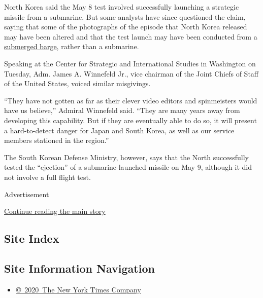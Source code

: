 North Korea said the May 8 test involved successfully launching a
strategic missile from a submarine. But some analysts have since
questioned the claim, saying that some of the photographs of the episode
that North Korea released may have been altered and that the test launch
may have been conducted from a
\href{http://38north.org/2015/05/jbermudez051315/}{submerged barge},
rather than a submarine.

Speaking at the Center for Strategic and International Studies in
Washington on Tuesday, Adm. James A. Winnefeld Jr., vice chairman of the
Joint Chiefs of Staff of the United States, voiced similar misgivings.

``They have not gotten as far as their clever video editors and
spinmeisters would have us believe,'' Admiral Winnefeld said. ``They are
many years away from developing this capability. But if they are
eventually able to do so, it will present a hard-to-detect danger for
Japan and South Korea, as well as our service members stationed in the
region.''

The South Korean Defense Ministry, however, says that the North
successfully tested the ``ejection'' of a submarine-launched missile on
May 9, although it did not involve a full flight test.

Advertisement

\protect\hyperlink{after-bottom}{Continue reading the main story}

\hypertarget{site-index}{%
\subsection{Site Index}\label{site-index}}

\hypertarget{site-information-navigation}{%
\subsection{Site Information
Navigation}\label{site-information-navigation}}

\begin{itemize}
\tightlist
\item
  \href{https://help.nytimes3xbfgragh.onion/hc/en-us/articles/115014792127-Copyright-notice}{©~2020~The
  New York Times Company}
\end{itemize}

